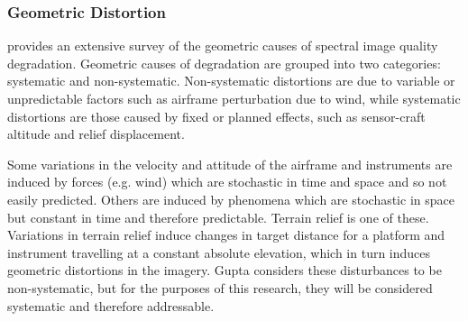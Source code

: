 




\subsubsection{Geometric Distortion}


\cite{Gupta2018} provides an extensive survey of the geometric causes of spectral image quality degradation. Geometric causes of degradation are grouped into two categories: systematic and non-systematic. Non-systematic distortions are due to variable or unpredictable factors such as airframe perturbation due to wind, while systematic distortions are those caused by fixed or planned effects, such as sensor-craft altitude and relief displacement.

Some variations in the velocity and attitude of the airframe and instruments are induced by forces (e.g. wind) which are stochastic in time and space and so not easily predicted. Others are induced by phenomena which are stochastic in space but constant in time and therefore predictable. Terrain relief is one of these. Variations in terrain relief induce changes in target distance for a platform and instrument travelling at a constant absolute elevation, which in turn induces geometric distortions in the imagery. Gupta \cite{Gupta2018} considers these disturbances to be non-systematic, but for the purposes of this research, they will be considered systematic and therefore addressable.

